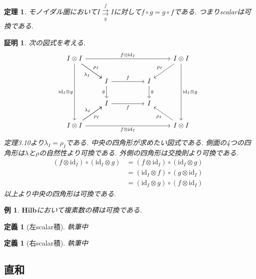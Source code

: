 \documentclass[a4paper,12pt]{ltjsarticle}
\theoremstyle{break}
\newtheorem{defn}[thm]{定義}
\newtheorem{eg}[thm]{例}
\newtheorem{thrm}[thm]{定理}
\newtheorem*{prf}{証明}
\newcommand{\hilb}{\mathbf{Hilb}}
\newcommand{\id}{\mathrm{id}}
\newcommand{\ci}{\circ}
\newcommand{\la}{\lambda}
\newcommand{\ot}{\otimes}
\numberwithin{equation}{section}
\begin{document}
\begin{thrm}
  モノイダル圏において$I \overset{f}{\underset{g}{\rightrightarrows}} I$に対して$f \ci g = g \ci f$である. 
  つまりscalarは可換である. 
\end{thrm} 

\begin{prf}
  次の図式を考える. 
  \[\begin{tikzcd}
    {I \ot I} &&&& {I \ot I} \\
    & I && I \\
    & I && I \\
    {I \ot I} &&&& {I \ot I}
    \arrow["f", from=2-2, to=2-4]
    \arrow["g"', from=2-2, to=3-2]
    \arrow["f"', from=3-2, to=3-4]
    \arrow["g", from=2-4, to=3-4]
    \arrow["{\la_I}"', from=1-1, to=2-2]
    \arrow["{\id_I \ot g}"', from=1-1, to=4-1]
    \arrow["{f \ot \id_I}"', from=4-1, to=4-5]
    \arrow["{\id_I \ot g}", from=1-5, to=4-5]
    \arrow["{\rho_I}"', from=1-5, to=2-4]
    \arrow["{f \ot \id_I}", from=1-1, to=1-5]
    \arrow["{\la_I}", from=4-1, to=3-2]
    \arrow["{\rho_I}"', from=4-1, to=3-2]
    \arrow["{\rho_I}", from=4-5, to=3-4]
    \arrow["{\rho_I}", from=1-1, to=2-2]
  \end{tikzcd}\]
  定理3.10より$\la_I=\rho_I$である. 
  中央の四角形が求めたい図式である. 
  側面の4つの四角形は$\la$と$\rho$の自然性より可換である. 
  外側の四角形は交換則より可換である. 
  \begin{align*}
    (f \ot \id_I) \ci (\id_I \ot g)
    &= (f \ot \id_I) \ci (\id_I \ot g) \\
    &= (\id_I \ot f) \ci (g \ot \id_I) \\
    &= (\id_I \ot g) \ci (f \ot \id_I)
  \end{align*}
  以上より中央の四角形は可換である. 
\end{prf}

\begin{eg}
  $\hilb$において複素数の積は可換である. 
\end{eg} 

\begin{defn}[左scalar積]
  執筆中
\end{defn}

\begin{defn}[右scalar積]
  執筆中
\end{defn}

\subsection{直和}
\end{document}
